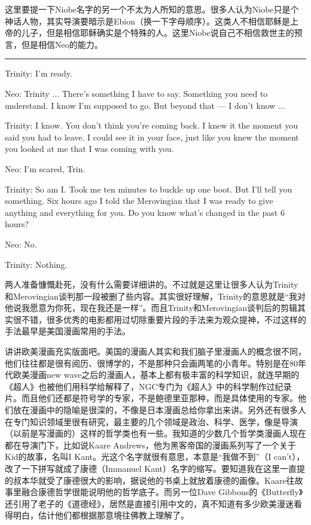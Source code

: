 \documentclass[UTF8]{ctexart}
\newcommand{\myparsep}{\noindent \rule[0.5ex]{\linewidth}{1pt}}
\newenvironment{myquote}{\color{green} \setlength{\leftskip}{6em} \setlength{\rightskip}{4em} \setlength{\parindent}{-2em}}{\par}
\begin{document}
这里要提一下Niobe名字的另一个不太为人所知的意思。很多人认为Niobe只是个神话人物，其实导演要暗示是Ebion（换一下字母顺序）。这类人不相信耶稣是上帝的儿子，但是相信耶稣确实是个特殊的人。这里Niobe说自己不相信救世主的预言，但是相信Neo的能力。

\myparsep

\begin{myquote}
Trinity: I'm ready.

Neo: Trinity ... There's something I have to say. Something you need to understand. I know I'm supposed to go. But beyond that --- I don't know ...

Trinity: I know. You don't think you're coming back. I knew it the moment you said you had to leave. I could see it in your face, just like you knew the moment you looked at me that I was coming with you.

Neo: I'm scared, Trin.

Trinity: So am I. Took me ten minutes to buckle up one boot. But I'll tell you something. Six hours ago I told the Merovingian that I was ready to give anything and everything for you. Do you know what's changed in the past 6 hours?

Neo: No.

Trinity: Nothing.
\end{myquote}

两人准备慷慨赴死，没有什么需要详细讲的。不过就是这里让很多人认为Trinity和Merovingian谈判那一段被删了些内容。其实很好理解，Trinity的意思就是“我对他说我愿意为你死，现在我还是一样”。而且Trinity和Merovingian谈判后的剪辑其实很不错，很多优秀的电影都用过切除重要片段的手法来为观众提神，不过这样的手法最早是美国漫画常用的手法。

讲讲欧美漫画充实版面吧。美国的漫画人其实和我们脑子里漫画人的概念很不同，他们往往都是很有阅历、很博学的，不是那种只会画两笔的小青年。特别是在80年代欧美漫画new wave之后的漫画人，基本上都有极丰富的科学知识，就连早期的《超人》也被他们用科学给解释了，NGC专门为《超人》中的科学制作过纪录片。而且他们还都是符号学的专家，不是鲍德里亚那种，而是具体使用的专家。他们放在漫画中的隐喻是很深的，不像是日本漫画总给你拿出来讲。另外还有很多人在专门知识领域里很有研究，最主要的几个领域是政治、科学、医学，像是导演（以前是写漫画的）这样的哲学类也有一些。我知道的少数几个哲学类漫画人现在都在导演门下，比如说Kaare Andrews，他为黑客帝国的漫画系列写了一个关于Kid的故事，名叫I Kant。光这个名字就很有意思，本意是“我做不到”（I can't），改了一下拼写就成了康德（Immanuel Kant）名字的缩写。要知道我在这里一直提的叔本华就受了康德很大的影响，据说他的书桌上就放着康德的画像。Kaare往故事里融合康德哲学很能说明他的哲学底子。而另一位Dave Gibbons的《Butterfly》还引用了老子的《道德经》，居然是直接引用中文的，真不知道有多少欧美漫迷看得明白，估计他们都根据那意境往佛教上理解了。
\end{document}
